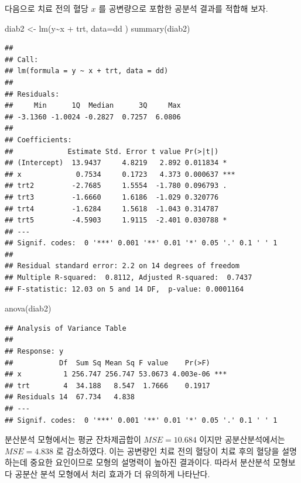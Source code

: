\documentclass[
  10pt,
]{book}
\newenvironment{Shaded}{\begin{snugshade}}{\end{snugshade}}
\newcommand{\AttributeTok}[1]{\textcolor[rgb]{0.77,0.63,0.00}{#1}}
\newcommand{\FunctionTok}[1]{\textcolor[rgb]{0.00,0.00,0.00}{#1}}
\newcommand{\NormalTok}[1]{#1}
\newcommand{\OtherTok}[1]{\textcolor[rgb]{0.56,0.35,0.01}{#1}}
\newcommand{\SpecialCharTok}[1]{\textcolor[rgb]{0.00,0.00,0.00}{#1}}
\theoremstyle{definition}
\theoremstyle{definition}
\theoremstyle{definition}
\theoremstyle{definition}
\theoremstyle{remark}
\begin{document}
다음으로 치료 전의 혈당 \(x\) 를 공변량으로 포함한 공분석 결과를 적합해 보자.

\begin{Shaded}
\begin{Highlighting}[]
\NormalTok{diab2 }\OtherTok{\textless{}{-}} \FunctionTok{lm}\NormalTok{(y}\SpecialCharTok{\textasciitilde{}}\NormalTok{x }\SpecialCharTok{+}\NormalTok{ trt, }\AttributeTok{data=}\NormalTok{dd )}
\FunctionTok{summary}\NormalTok{(diab2)}
\end{Highlighting}
\end{Shaded}

\begin{verbatim}
## 
## Call:
## lm(formula = y ~ x + trt, data = dd)
## 
## Residuals:
##     Min      1Q  Median      3Q     Max 
## -3.1360 -1.0024 -0.2827  0.7257  6.0806 
## 
## Coefficients:
##             Estimate Std. Error t value Pr(>|t|)    
## (Intercept)  13.9437     4.8219   2.892 0.011834 *  
## x             0.7534     0.1723   4.373 0.000637 ***
## trt2         -2.7685     1.5554  -1.780 0.096793 .  
## trt3         -1.6660     1.6186  -1.029 0.320776    
## trt4         -1.6284     1.5618  -1.043 0.314787    
## trt5         -4.5903     1.9115  -2.401 0.030788 *  
## ---
## Signif. codes:  0 '***' 0.001 '**' 0.01 '*' 0.05 '.' 0.1 ' ' 1
## 
## Residual standard error: 2.2 on 14 degrees of freedom
## Multiple R-squared:  0.8112, Adjusted R-squared:  0.7437 
## F-statistic: 12.03 on 5 and 14 DF,  p-value: 0.0001164
\end{verbatim}

\begin{Shaded}
\begin{Highlighting}[]
\FunctionTok{anova}\NormalTok{(diab2)}
\end{Highlighting}
\end{Shaded}

\begin{verbatim}
## Analysis of Variance Table
## 
## Response: y
##           Df  Sum Sq Mean Sq F value    Pr(>F)    
## x          1 256.747 256.747 53.0673 4.003e-06 ***
## trt        4  34.188   8.547  1.7666    0.1917    
## Residuals 14  67.734   4.838                      
## ---
## Signif. codes:  0 '***' 0.001 '**' 0.01 '*' 0.05 '.' 0.1 ' ' 1
\end{verbatim}

분산분석 모형에서는 평균 잔차제곱합이 \(MSE=10.684\) 이지만 공분산분석에서는 \(MSE=4.838\) 로 감소하였다. 이는 공변량인 치료 전의 혈당이 치료 후의 혈당을 설명하는데 중요한 요인이므로 모형의 설명력이 높아진 결과이다. 따라서 분산분석 모형보다 공분산 분석 모형에서 처리 효과가 더 유의하게 나타난다.
\end{document}
